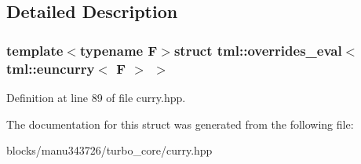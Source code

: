 \subsection{Detailed Description}
\subsubsection*{template$<$typename F$>$struct tml\+::overrides\+\_\+eval$<$ tml\+::euncurry$<$ F $>$ $>$}



Definition at line 89 of file curry.\+hpp.



The documentation for this struct was generated from the following file\+:\begin{DoxyCompactItemize}
\item 
blocks/manu343726/turbo\+\_\+core/curry.\+hpp\end{DoxyCompactItemize}
